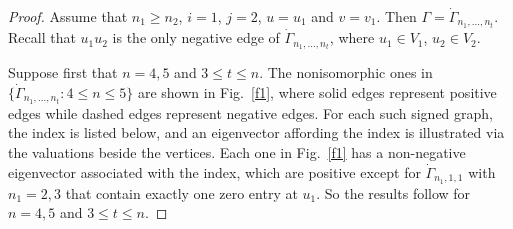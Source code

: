 \documentclass[10pt,a4paper]{amsart}
\numberwithin{equation}{section}
\begin{document}
\begin{proof} Assume that $n_1\ge n_2$, $i=1$,  $j=2$,  $u=u_1$  and $v=v_1$. Then 
$\Gamma=\dot\Gamma_{n_1, \dots, n_t}$. Recall that $u_1u_2$ is the only negative edge of $\dot\Gamma_{n_1, \dots, n_t}$, where  $u_1\in V_1$, $u_2\in V_2$. 

Suppose first that $n=4, 5$ and $3\le t\le n$. The nonisomorphic ones in $\{\dot\Gamma_{n_1, \dots, n_t}: 4\le n\le 5\}$ are shown in Fig.~\ref{f1}, where solid edges represent positive edges while dashed edges represent negative edges. For each such signed graph, the index is listed below, and an eigenvector affording the index is illustrated via the valuations beside the vertices.
Each one in  Fig.~\ref{f1} has a non-negative eigenvector associated with the index, which are positive except for $\dot\Gamma_{n_1, 1, 1}$ with $n_1=2,3$ that contain exactly one zero entry at $u_1$. So the results follow for $n=4, 5$ and $3\le t\le n$. 





\end{proof}
\end{document}
